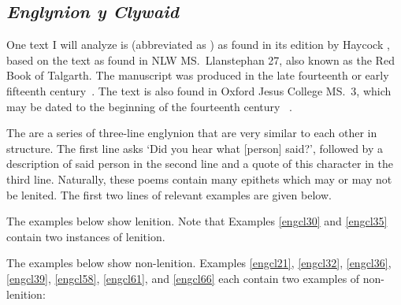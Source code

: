 \subsection{\textit{Englynion y Clywaid}}
One text I will analyze is  (abbreviated as ) as found in its edition by Haycock \autocite*[313--337]{haycock_blodeugerdd_1994}, based on the text as found in NLW MS.\ Llanstephan 27, also known as the Red Book of Talgarth. The manuscript was produced in the late fourteenth or early fifteenth century~\autocite[60]{huws_medieval_2000}. The text is also found in Oxford Jesus College MS.\ 3, which may be dated to the beginning of the fourteenth century ~\autocite[297]{haycock_blodeugerdd_1994}.

The  are a series of three-line englynion that are very similar to each other in structure. The first line asks `Did you hear what [person] said?', followed by a description of said person in the second line and a quote of this character in the third line. Naturally, these poems contain many epithets which may or may not be lenited. The first two lines of relevant examples are given below. 

The examples below show lenition. Note that Examples \ref{engcl30} and \ref{engcl35} contain two instances of lenition.
\begin{mwl}
\end{mwl}

The examples below show non-lenition. Examples \ref{engcl21},
\ref{engcl32},
\ref{engcl36},
\ref{engcl39},
\ref{engcl58},
\ref{engcl61}, and
\ref{engcl66} each contain two examples of non-lenition:


